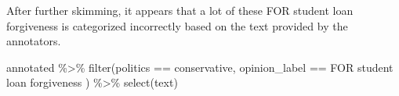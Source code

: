 \documentclass[
]{article}
\newenvironment{Shaded}{\begin{snugshade}}{\end{snugshade}}
\newcommand{\FunctionTok}[1]{\textcolor[rgb]{0.00,0.00,0.00}{#1}}
\newcommand{\NormalTok}[1]{#1}
\newcommand{\SpecialCharTok}[1]{\textcolor[rgb]{0.00,0.00,0.00}{#1}}
\newcommand{\StringTok}[1]{\textcolor[rgb]{0.31,0.60,0.02}{#1}}
\begin{document}
After further skimming, it appears that a lot of these FOR student loan
forgiveness is categorized incorrectly based on the text provided by the
annotators.

\begin{Shaded}
\begin{Highlighting}[]
\NormalTok{annotated }\SpecialCharTok{\%\textgreater{}\%} \FunctionTok{filter}\NormalTok{(politics }\SpecialCharTok{==} \StringTok{\textquotesingle{}conservative\textquotesingle{}}\NormalTok{, opinion\_label }\SpecialCharTok{==} \StringTok{\textquotesingle{}FOR student loan forgiveness \textquotesingle{}}\NormalTok{) }\SpecialCharTok{\%\textgreater{}\%} \FunctionTok{select}\NormalTok{(}\StringTok{\textquotesingle{}text\textquotesingle{}}\NormalTok{)}
\end{Highlighting}
\end{Shaded}
\end{document}
